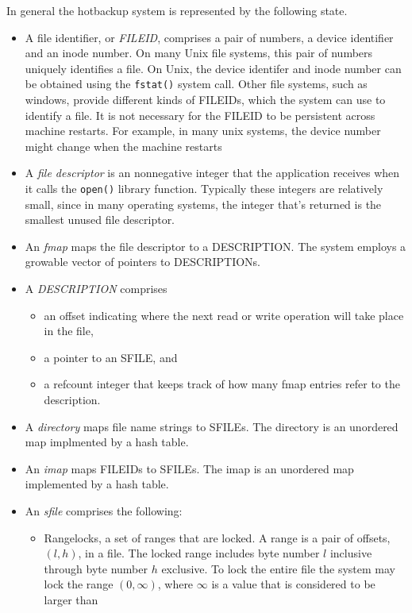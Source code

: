 \documentclass[10pt]{article}
\begin{document}
In general the hotbackup system is represented by the following state.
\begin{itemize}
\item A file identifier, or \textit{FILEID}, comprises a pair of
  numbers, a device identifier and an inode number.  On many Unix file
  systems, this pair of numbers uniquely identifies a file.  On Unix,
  the device identifer and inode number can be obtained using the
  \texttt{fstat()} system call.  Other file systems, such as windows,
  provide different kinds of FILEIDs, which the system can use to
  identify a file.  It is not necessary for the FILEID to be
  persistent across machine restarts.  For example, in many unix
  systems, the device number might change when the machine restarts
\item A \textit{file descriptor} is an nonnegative integer that the
  application receives when it calls the \texttt{open()} library
  function.  Typically these integers are relatively small, since in
  many operating systems, the integer that's returned is the smallest
  unused file descriptor.
\item An \textit{fmap} maps the file descriptor to a DESCRIPTION.  The
  system employs a growable vector of pointers to DESCRIPTIONs.
\item A \textit{DESCRIPTION} comprises
 \begin{itemize}
  \item an offset indicating where the next read or write operation will take place in the file,
  \item a pointer to an SFILE, and
  \item a refcount integer that keeps track of how many fmap entries refer to the description.
 \end{itemize}
\item A \textit{directory} maps file name strings to SFILEs.  The
  directory is an unordered map implmented by a hash table.
\item An \textit{imap} maps FILEIDs to SFILEs.  The imap is an unordered map implemented by a hash table.
\item An \textit{sfile} comprises the following:
 \begin{itemize}
   \item Rangelocks, a set of ranges that are locked.  A range is a
     pair of offsets, $(l,h)$, in a file.  The locked range includes
     byte number $l$ inclusive through byte number $h$ exclusive.  To
     lock the entire file the system may lock the range $(0, \infty)$,
     where $\infty$ is a value that is considered to be larger than

\end{itemize}
\end{itemize}
\end{document}
